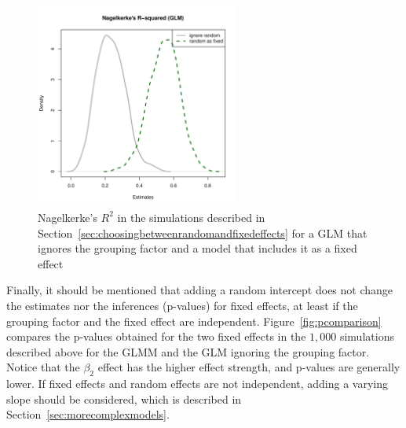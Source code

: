 \documentclass[a4paper,12pt]{article}
\begin{document}
\begin{figure}[!htpb]
  \centering
  \includegraphics[width=0.6\textwidth]{graphics/rsqglmj5i20}
  \caption{Nagelkerke's $R^2$ in the simulations described in Section~\ref{sec:choosingbetweenrandomandfixedeffects} for a GLM that ignores the grouping factor and a model that includes it as a fixed effect}
  \label{fig:rsqglmj5i20}
\end{figure}

Finally, it should be mentioned that adding a random intercept does not change the estimates nor the inferences (p-values) for fixed effects, at least if the grouping factor and the fixed effect are independent.
Figure~\ref{fig:pcomparison} compares the p-values obtained for the two fixed effects in the $1,000$ simulations described above for the GLMM and the GLM ignoring the grouping factor.
Notice that the $\beta_2$ effect has the higher effect strength, and p-values are generally lower.
If fixed effects and random effects are not independent, adding a varying slope should be considered, which is described in Section~\ref{sec:morecomplexmodels}.
\end{document}
